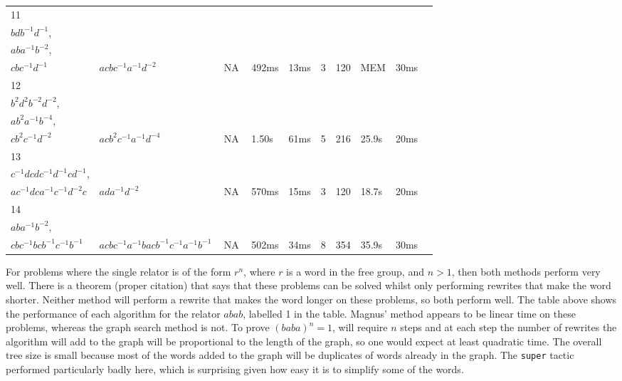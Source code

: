 \documentclass[12pt]{article} %
\theoremstyle{definition}
\theoremstyle{definition}
\theoremstyle{definition}
\theoremstyle{definition}
\theoremstyle{definition}
\theoremstyle{definition}
\begin{document}
\begin{landscape}
\begin{longtable}[!h]{l|l|l|lll|llll|l|l}
  11 & \begin{tabular}[c]{@{}l@{}}$aca^{-1}c^{-1}$,\\ $bdb^{-1}d^{-1}$,\\ $aba^{-1}b^{-2}$,\\ $cbc^{-1}d^{-1}$\end{tabular} & $acbc^{-1}a^{-1}d^{-2}$ & \multicolumn{3}{c|}{NA} & 492ms & 13ms & 3 & 120 & MEM & 30ms \\ \hline
  12 & \begin{tabular}[c]{@{}l@{}}$aca^{-1}c^{-1}$,\\ $b^2d^2b^{-2}d^{-2}$,\\ $ab^2a^{-1}b^{-4}$,\\ $cb^2c^{-1}d^{-2}$\end{tabular} & $acb^2c^{-1}a^{-1}d^{-4}$ & \multicolumn{3}{c|}{NA} & 1.50s & 61ms & 5 & 216 & 25.9s & 20ms \\ \hline
  13 & \begin{tabular}[c]{@{}l@{}}$aca^{-1}c^{-1}$,\\ $c^{-1}dcdc^{-1}d^{-1}cd^{-1}$,\\ $ac^{-1}dca^{-1}c^{-1}d^{-2}c$\end{tabular} & $ada^{-1}d^{-2}$ & \multicolumn{3}{c|}{NA} & 570ms & 15ms & 3 & 120 & 18.7s & 20ms \\ \hline
  14 & \begin{tabular}[c]{@{}l@{}}$aca^{-1}c^{-1}$,\\ $aba^{-1}b^{-2}$,\\ $cbc^{-1}bcb^{-1}c^{-1}b^{-1}$\end{tabular} & $acbc^{-1}a^{-1}bacb^{-1}c^{-1}a^{-1}b^{-1}$ & \multicolumn{3}{c|}{NA} & 502ms & 34ms & 8 & 354 & 35.9s & 30ms
  \label{tab:my-table}\\
  \end{longtable}
\end{landscape}
\pagebreak

For problems where the single relator is of the form $r^n$, where
$r$ is a word in the free group, and $n > 1$, then both methods perform
very well. There is a theorem (proper citation) that says that
these problems can be solved whilst only performing rewrites that
make the word shorter. Neither method will perform a rewrite that
makes the word longer on these problems, so both perform well. The table
above shows the performance of each algorithm for the relator $abab$,
labelled 1 in the table.
Magnus' method appears to be linear time on these problems, whereas
the graph search method is not. To prove $(baba)^n = 1$, will require
$n$ steps and at each step the number of rewrites the algorithm
will add to the graph will be proportional to the length of the graph,
so one would expect at least quadratic time. The overall tree size
is small because most of the words added to the graph will
be duplicates of words already in the graph. The \lstinline{super} tactic performed particularly
badly here, which is surprising given how easy it is to simplify some of the words.
\end{document}

